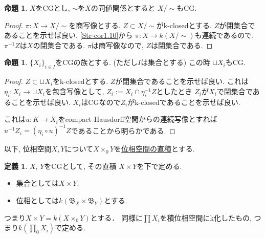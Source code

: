 \documentclass[dvipdfmx,a4paper,11pt]{article}
\theoremstyle{definition}
\newtheorem{prop}[thm]{命題}
\newtheorem{dfn}[thm]{定義}
\begin{document}
 \begin{tcolorbox}
 [colback = white, colframe = green!35!black, fonttitle = \bfseries,breakable = true]
\begin{prop}\cite[Prop2.1]{Str}
\label{Str-prop2.1}
$X$をCGとし, $\sim$を$X$の同値関係とすると
$X/\sim$もCG.
\end{prop}
\end{tcolorbox}

\begin{proof}
$\pi : X \to X/\sim$を商写像とする. 
$Z \subset X/\sim$がk-closedとする. $Z$が閉集合であることを示せば良い.
\ref{Str-cor1.10}から
$\pi : X \to k(X/\sim)$も連続であるので, $\pi^{-1}Z$は$X$の閉集合である.
$\pi$は商写像なので, $Z$は閉集合である. 
\end{proof}

 \begin{tcolorbox}
 [colback = white, colframe = green!35!black, fonttitle = \bfseries,breakable = true]
\begin{prop}\cite[Prop2.2]{Str}
\label{Str-prop2.2}
$\{ X_i \}_{i \in I}$をCGの族とする. (ただし$I$は集合とする)
この時
$\sqcup X_i$もCG.
\end{prop}
\end{tcolorbox}
\begin{proof}
$Z \subset \sqcup X_i$をk-closedとする.
$Z$が閉集合であることを示せば良い. 
これは$\eta_i : X_i \to \sqcup X_i$を包含写像として, $Z_i := X_i \cap \eta_{i}^{-1}Z$としたとき
$Z_i$が$X_i$で閉集合であることを示せば良い.
$X_i$はCGなので$Z_i$がk-closedであることを示せば良い.

これは$u : K \to X_i$をcompact Hausdorff空間からの連続写像とすれば
$u^{-1}Z_i = (\eta_i \circ u)^{-1}Z$であることから明らかである. 
\end{proof}

以下, 位相空間$X,Y$について$X \times_0 Y$を\underline{位相空間の直積}とする.
 \begin{tcolorbox}
 [colback = white, colframe = green!35!black, fonttitle = \bfseries,breakable = true]
\begin{dfn}\cite[Def 2.3]{Str}
\label{Str-def-2.3}
$X$, $Y$をCGとして, その直積
$X \times Y$を下で定める.
\begin{itemize}
\item 集合としては$X \times Y$.
\item 位相としては$k(\mathfrak{B}_X \times \mathfrak{B}_Y)$とする.
\end{itemize}
つまり$X \times Y = k(X \times_0 Y)$とする．  同様に$\prod X_i$を積位相空間にk化したもの, つまり$k(\prod_0 X_i)$で定める. 
\end{dfn}
\end{tcolorbox}
\end{document}
